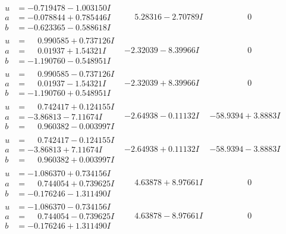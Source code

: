 \documentclass[1p]{elsarticle_modified}
\theoremstyle{definition}
\begin{document}
$$\begin{array}{c|c|c}
\begin{aligned}
u &= -0.719478 - 1.003150 I \\
a &= -0.078844 + 0.785446 I \\
b &= -0.623365 - 0.588618 I\end{aligned}
 & \phantom{-}5.28316 - 2.70789 I & \phantom{-0.000000 } 0 \\ \hline\begin{aligned}
u &= \phantom{-}0.990585 + 0.737126 I \\
a &= \phantom{-}0.01937 + 1.54321 I \\
b &= -1.190760 - 0.548951 I\end{aligned}
 & -2.32039 - 8.39966 I & \phantom{-0.000000 } 0 \\ \hline\begin{aligned}
u &= \phantom{-}0.990585 - 0.737126 I \\
a &= \phantom{-}0.01937 - 1.54321 I \\
b &= -1.190760 + 0.548951 I\end{aligned}
 & -2.32039 + 8.39966 I & \phantom{-0.000000 } 0 \\ \hline\begin{aligned}
u &= \phantom{-}0.742417 + 0.124155 I \\
a &= -3.86813 - 7.11674 I \\
b &= \phantom{-}0.960382 - 0.003997 I\end{aligned}
 & -2.64938 - 0.11132 I & -58.9394 + 3.8883 I \\ \hline\begin{aligned}
u &= \phantom{-}0.742417 - 0.124155 I \\
a &= -3.86813 + 7.11674 I \\
b &= \phantom{-}0.960382 + 0.003997 I\end{aligned}
 & -2.64938 + 0.11132 I & -58.9394 - 3.8883 I \\ \hline\begin{aligned}
u &= -1.086370 + 0.734156 I \\
a &= \phantom{-}0.744054 + 0.739625 I \\
b &= -0.176246 - 1.311490 I\end{aligned}
 & \phantom{-}4.63878 + 8.97661 I & \phantom{-0.000000 } 0 \\ \hline\begin{aligned}
u &= -1.086370 - 0.734156 I \\
a &= \phantom{-}0.744054 - 0.739625 I \\
b &= -0.176246 + 1.311490 I\end{aligned}
 & \phantom{-}4.63878 - 8.97661 I & \phantom{-0.000000 } 0 \\ \hline\begin{aligned}

\end{aligned}
\end{array}$$
\end{document}
